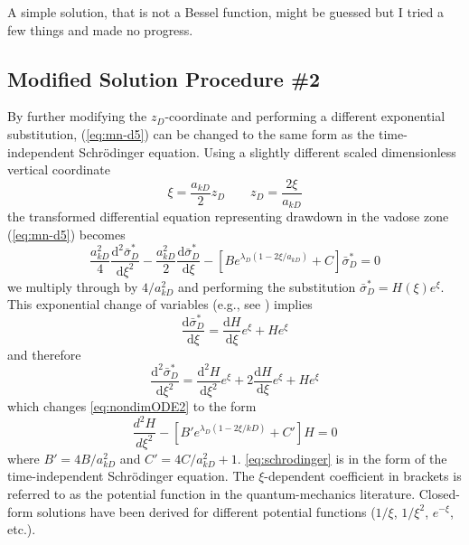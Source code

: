 \documentclass[12pt,letterpaper]{article}
\begin{document}
A simple solution, that is not a Bessel function, might be guessed but I tried a few things and made no progress.

\subsection{Modified Solution Procedure \#2} 
By further modifying the $z_D$-coordinate and performing a different exponential substitution, (\ref{eq:mn-d5}) can be changed to the same form as the time-independent Schr\"{o}dinger equation.  Using a slightly different scaled dimensionless vertical coordinate 
\begin{equation}\nonumber
 \xi= \frac{a_{kD}}{2} z_D \qquad z_D=\frac{2\xi}{a_{kD}} 
\end{equation}
the transformed differential equation representing drawdown in the vadose zone (\ref{eq:mn-d5}) becomes
\begin{equation}
  \label{eq:nondimODE2}
  \frac{a_{kD}^2}{4} \frac{\mathrm{d}^2
    \bar{\sigma}_D^{\ast}}{\mathrm{d}\xi^2} - \frac{a_{kD}^2}{2}
  \frac{\mathrm{d} \bar{\sigma}_D^{\ast}}{\mathrm{d}\xi} - \left[
    B e^{\lambda_D (1-2\xi/a_{kD})} + C\right] \bar{\sigma}_D^{\ast}=0
\end{equation}
we multiply through by $4/a_{kD}^2$ and performing the substitution $\bar{\sigma}^{\ast}_{D} = H(\xi) e^\xi$.  This exponential change of variables (e.g., see \cite{kuhlman2008quasilinear}) implies
\begin{equation}
  \nonumber
  \frac{\mathrm{d} \bar{\sigma}^{\ast}_{D}}{\mathrm{d} \xi} = \frac{\mathrm{d}H}{\mathrm{d}\xi} e^\xi + H e^\xi  
\end{equation}
and therefore
\begin{equation}
  \nonumber
  \frac{\mathrm{d}^2 \bar{\sigma}^{\ast}_{D}}{\mathrm{d} \xi^2} = \frac{\mathrm{d}^2H}{\mathrm{d}\xi^2} e^\xi + 2\frac{\mathrm{d}H}{\mathrm{d}\xi} e^\xi + He^\xi  
\end{equation}
which changes \eqref{eq:nondimODE2} to the form
\begin{equation}
  \label{eq:schrodinger}
  \frac{d^2 H}{d \xi^2} - \left[B' e^{\lambda_D (1-2\xi/{kD})} + C' \right]H = 0
\end{equation}
where $B' = 4B/a_{kD}^2$ and $C'=4C/a_{kD}^2 + 1$.  \eqref{eq:schrodinger} is in the form of the time-independent Schr\"{o}dinger equation.  The $\xi$-dependent coefficient in brackets is referred to as the potential function in the quantum-mechanics literature.  Closed-form solutions have been derived for different potential functions ($1/\xi$, $1/\xi^2$, $e^{-\xi}$, etc.).  
\end{document}
